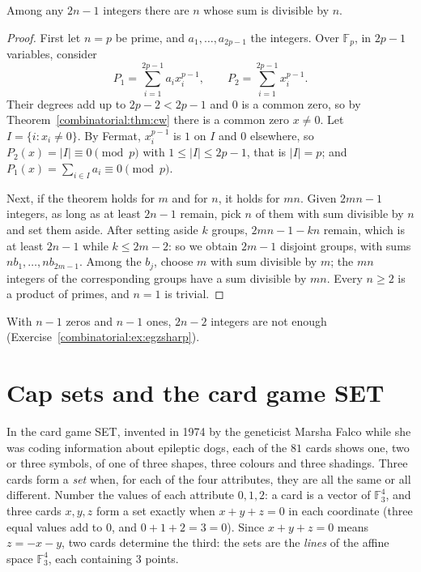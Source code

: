 \begin{theorem}\label{combinatorial:thm:egz}
Among any $2n-1$ integers there are $n$ whose sum is divisible by $n$.
\end{theorem}
\begin{proof}
First let $n=p$ be prime, and $a_1,\dots,a_{2p-1}$ the integers. Over $\mathbb F_p$, in $2p-1$ variables, consider
\[
P_1=\sum_{i=1}^{2p-1}a_ix_i^{p-1},\qquad P_2=\sum_{i=1}^{2p-1}x_i^{p-1}.
\]
Their degrees add up to $2p-2<2p-1$ and $0$ is a common zero, so by Theorem~\ref{combinatorial:thm:cw} there is a common zero $x\ne0$. Let $I=\{i:x_i\ne0\}$. By Fermat, $x_i^{p-1}$ is $1$ on $I$ and $0$ elsewhere, so
$P_2(x)=|I|\equiv0\pmod p$ with $1\le|I|\le2p-1$, that is $|I|=p$; and $P_1(x)=\sum_{i\in I}a_i\equiv0\pmod p$.

Next, if the theorem holds for $m$ and for $n$, it holds for $mn$. Given $2mn-1$ integers, as long as at least $2n-1$ remain, pick $n$ of them with sum divisible by $n$ and set them aside. After setting aside
$k$ groups, $2mn-1-kn$ remain, which is at least $2n-1$ while $k\le2m-2$: so we obtain $2m-1$ disjoint groups, with sums $nb_1,\dots,nb_{2m-1}$. Among the $b_j$, choose $m$ with sum divisible by $m$; the
$mn$ integers of the corresponding groups have a sum divisible by $mn$. Every $n\ge2$ is a product of primes, and $n=1$ is trivial.
\end{proof}

With $n-1$ zeros and $n-1$ ones, $2n-2$ integers are not enough (Exercise~\ref{combinatorial:ex:egzsharp}).

\section{Cap sets and the card game SET}

In the card game SET, invented in 1974 by the geneticist Marsha Falco while she was coding information about epileptic dogs, each of the $81$ cards shows one, two or three symbols, of one of three shapes,
three colours and three shadings. Three cards form a \emph{set} when, for each of the four attributes, they are all the same or all different. Number the values of each attribute $0,1,2$: a card is a vector
of $\mathbb F_3^4$, and three cards $x,y,z$ form a set exactly when $x+y+z=0$ in each coordinate (three equal values add to $0$, and $0+1+2=3=0$). Since $x+y+z=0$ means $z=-x-y$, two cards determine the
third: the sets are the \emph{lines} of the affine space $\mathbb F_3^4$, each containing $3$ points.

